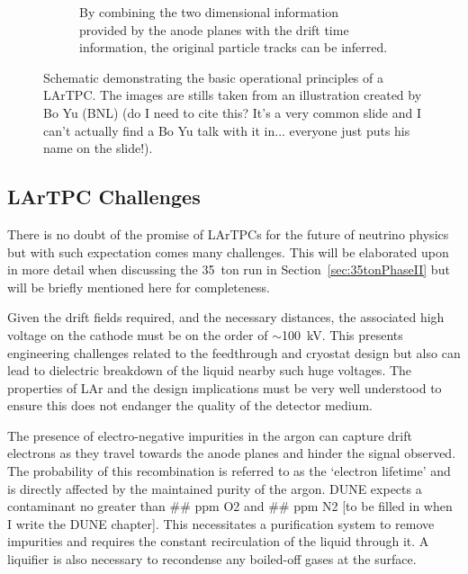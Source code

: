 \begin{figure}[p]
\begin{subfigure}[t]{0.48\linewidth}
    \caption{By combining the two dimensional information provided by the anode planes with the drift time information, the original particle tracks can be inferred.}
    \label{fig:LArTPCOperation4}
  \end{subfigure}
  \caption[Schematic demonstrating the basic operational principles of a LArTPC.]{Schematic demonstrating the basic operational principles of a LArTPC.  The images are stills taken from an illustration created by Bo Yu (BNL) {\color{red}(do I need to cite this?  It's a very common slide and I can't actually find a Bo Yu talk with it in... everyone just puts his name on the slide!)}.}
  \label{fig:LArTPCOperation}
\end{figure}

\subsection{LArTPC Challenges}\label{sec:LArTPCChallenges}

There is no doubt of the promise of LArTPCs for the future of neutrino physics but with such expectation comes many challenges.  This will be elaborated upon in more detail when discussing the 35~ton run in Section~\ref{sec:35tonPhaseII} but will be briefly mentioned here for completeness.

Given the drift fields required, and the necessary distances, the associated high voltage on the cathode must be on the order of $\sim$100~kV.  This presents engineering challenges related to the feedthrough and cryostat design but also can lead to dielectric breakdown of the liquid nearby such huge voltages.  The properties of LAr and the design implications must be very well understood to ensure this does not endanger the quality of the detector medium.

The presence of electro-negative impurities in the argon can capture drift electrons as they travel towards the anode planes and hinder the signal observed.  The probability of this recombination is referred to as the `electron lifetime' and is directly affected by the maintained purity of the argon.  DUNE expects a contaminant no greater than \#\# ppm O2 and \#\# ppm N2 [to be filled in when I write the DUNE chapter].  This necessitates a purification system to remove impurities and requires the constant recirculation of the liquid through it.  A liquifier is also necessary to recondense any boiled-off gases at the surface.

